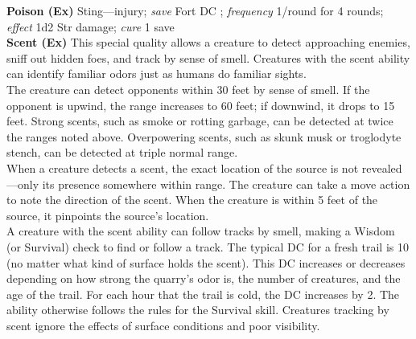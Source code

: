 \textbf{Poison (Ex)} Sting---injury; \textit{save} Fort DC ; \textit{frequency} 1/round for 4 rounds; \\ \textit{effect} 1d2 Str damage; \textit{cure} 1 save \\

\textbf{Scent (Ex)} This special quality allows a creature to detect approaching enemies, sniff out hidden foes, and track by sense of smell. Creatures with the scent ability can identify familiar odors just as humans do familiar sights. \\

The creature can detect opponents within 30 feet by sense of smell. If the opponent is upwind, the range increases to 60 feet; if downwind, it drops to 15 feet. Strong scents, such as smoke or rotting garbage, can be detected at twice the ranges noted above. Overpowering scents, such as skunk musk or troglodyte stench, can be detected at triple normal range. \\

When a creature detects a scent, the exact location of the source is not revealed—only its presence somewhere within range. The creature can take a move action to note the direction of the scent. When the creature is within 5 feet of the source, it pinpoints the source's location. \\

A creature with the scent ability can follow tracks by smell, making a Wisdom (or Survival) check to find or follow a track. The typical DC for a fresh trail is 10 (no matter what kind of surface holds the scent). This DC increases or decreases depending on how strong the quarry's odor is, the number of creatures, and the age of the trail. For each hour that the trail is cold, the DC increases by 2. The ability otherwise follows the rules for the Survival skill. Creatures tracking by scent ignore the effects of surface conditions and poor visibility. \\

\newpage
